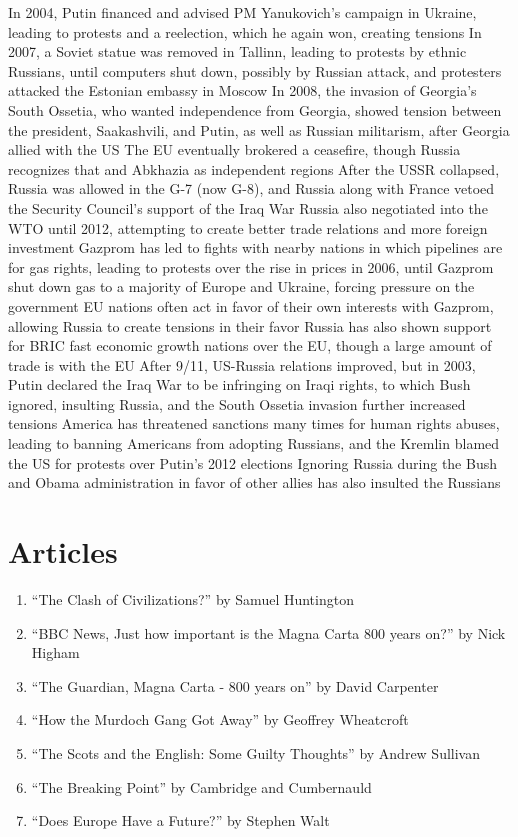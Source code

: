 \documentclass[11 pt, twoside]{article}
\newenvironment{outline*}
{
	\begin{outline}[enumerate]
	}
	{\end{outline}
}
\begin{document}
\begin{outline*}
\2 In 2004, Putin financed and advised PM Yanukovich's campaign in Ukraine, leading to protests and a reelection, which he again won, creating tensions
\2 In 2007, a Soviet statue was removed in Tallinn, leading to protests by ethnic Russians, until computers shut down, possibly by Russian attack, and protesters attacked the Estonian embassy in Moscow
\2 In 2008, the invasion of Georgia's South Ossetia, who wanted independence from Georgia, showed tension between the president, Saakashvili, and Putin, as well as Russian militarism, after Georgia allied with the US
\3 The EU eventually brokered a ceasefire, though Russia recognizes that and Abkhazia as independent regions
\2 After the USSR collapsed, Russia was allowed in the G-7 (now G-8), and Russia along with France vetoed the Security Council's support of the Iraq War
\3 Russia also negotiated into the WTO until 2012, attempting to create better trade relations and more foreign investment
\2 Gazprom has led to fights with nearby nations in which pipelines are for gas rights, leading to protests over the rise in prices in 2006, until Gazprom shut down gas to a majority of Europe and Ukraine, forcing pressure on the government
\3 EU nations often act in favor of their own interests with Gazprom, allowing Russia to create tensions in their favor
\3 Russia has also shown support for BRIC fast economic growth nations over the EU, though a large amount of trade is with the EU
\2 After 9/11, US-Russia relations improved, but in 2003, Putin declared the Iraq War to be infringing on Iraqi rights, to which Bush ignored, insulting Russia, and the South Ossetia invasion further increased tensions
\3 America has threatened sanctions many times for human rights abuses, leading to banning Americans from adopting Russians, and the Kremlin blamed the US for protests over Putin's 2012 elections
\3 Ignoring Russia during the Bush and Obama administration in favor of other allies has also insulted the Russians
\end{outline*}
\section{Articles}
\begin{enumerate}
\item \hypertarget{1}{``The Clash of Civilizations?'' by Samuel Huntington}
\item \hypertarget{2}{``BBC News, Just how important is the Magna Carta 800 years on?'' by Nick Higham}
\item \hypertarget{3}{``The Guardian, Magna Carta - 800 years on'' by David Carpenter}
\item \hypertarget{4}{``How the Murdoch Gang Got Away'' by Geoffrey Wheatcroft}
\item \hypertarget{5}{``The Scots and the English: Some Guilty Thoughts'' by Andrew Sullivan}
\item \hypertarget{6}{``The Breaking Point'' by Cambridge and Cumbernauld}
\item \hypertarget{7}{``Does Europe Have a Future?'' by Stephen Walt}
\end{enumerate}
\end{document}
